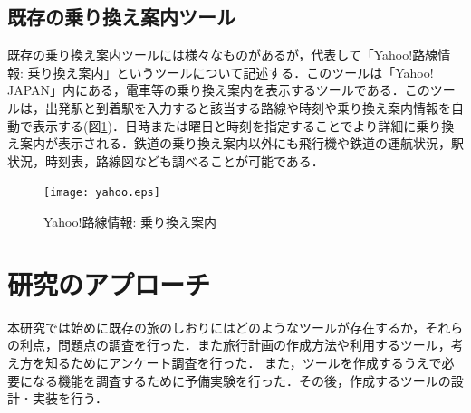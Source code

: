 \documentclass{funthesis}
\begin{document}
\section{既存の乗り換え案内ツール}
既存の乗り換え案内ツールには様々なものがあるが，代表して「Yahoo!路線情報: 乗り換え案内」\cite{yahoo}というツールについて記述する．このツールは「Yahoo! JAPAN」内にある，電車等の乗り換え案内を表示するツールである．このツールは，出発駅と到着駅を入力すると該当する路線や時刻や乗り換え案内情報を自動で表示する(図\ref{Lyahoo})．日時または曜日と時刻を指定することでより詳細に乗り換え案内が表示される．鉄道の乗り換え案内以外にも飛行機や鉄道の運航状況，駅状況，時刻表，路線図なども調べることが可能である．

\begin{figure}[htpb]
\begin{center}
\texttt{[image: yahoo.eps]}
\end{center}
\caption{Yahoo!路線情報: 乗り換え案内}
\label{Lyahoo}
\end{figure}



\chapter{研究のアプローチ}%

本研究では始めに既存の旅のしおりにはどのようなツールが存在するか，それらの利点，問題点の調査を行った．また旅行計画の作成方法や利用するツール，考え方を知るためにアンケート調査を行った．
また，ツールを作成するうえで必要になる機能を調査するために予備実験を行った．その後，作成するツールの設計・実装を行う．





\end{document}
